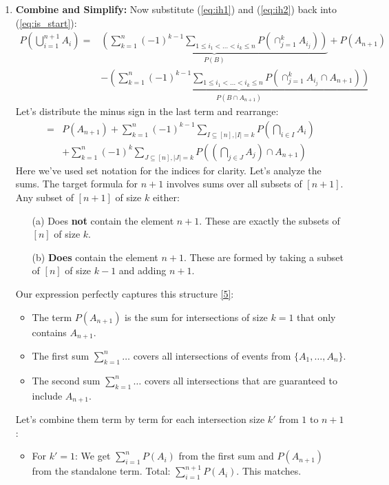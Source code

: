 \documentclass[11pt,a4paper]{article}
\begin{document}
\begin{enumerate}
    \item \textbf{Combine and Simplify:} Now substitute (\ref{eq:ih1}) and (\ref{eq:ih2}) back into (\ref{eq:is_start}):
    \begin{align*}
    P\left(\bigcup_{i=1}^{n+1} A_i\right) = & \underbrace{\left( \sum_{k=1}^n (-1)^{k-1} \sum_{1 \le i_1 < \dots < i_k \le n} P(\cap_{j=1}^k A_{i_j}) \right)}_{P(B)} + P(A_{n+1}) \\
    & - \underbrace{\left( \sum_{k=1}^n (-1)^{k-1} \sum_{1 \le i_1 < \dots < i_k \le n} P(\cap_{j=1}^k A_{i_j} \cap A_{n+1}) \right)}_{P(B \cap A_{n+1})}
    \end{align*}
    Let's distribute the minus sign in the last term and rearrange:
    \begin{align*}
    = & P(A_{n+1}) + \sum_{k=1}^n (-1)^{k-1} \sum_{I \subseteq [n], |I|=k} P(\bigcap_{i \in I} A_i) \\
    & + \sum_{k=1}^n (-1)^{k} \sum_{J \subseteq [n], |J|=k} P\left(\left(\bigcap_{j \in J} A_j\right) \cap A_{n+1}\right)
    \end{align*}
    Here we've used set notation for the indices for clarity. Let's analyze the sums. The target formula for $n+1$ involves sums over all subsets of $[n+1]$. Any subset of $[n+1]$ of size $k$ either:
    \begin{itemize}
        \item[(a)] Does \textbf{not} contain the element $n+1$. These are exactly the subsets of $[n]$ of size $k$.
        \item[(b)] \textbf{Does} contain the element $n+1$. These are formed by taking a subset of $[n]$ of size $k-1$ and adding $n+1$.
    \end{itemize}
    Our expression perfectly captures this structure \hyperlink{note:pascal}{[5]}:
    \begin{itemize}
        \item The term $P(A_{n+1})$ is the sum for intersections of size $k=1$ that only contains $A_{n+1}$.
        \item The first sum $\sum_{k=1}^n \dots$ covers all intersections of events from $\{A_1, \dots, A_n\}$.
        \item The second sum $\sum_{k=1}^n \dots$ covers all intersections that are guaranteed to include $A_{n+1}$.
    \end{itemize}
    Let's combine them term by term for each intersection size $k'$ from $1$ to $n+1$:
    \begin{itemize}
        \item For $k'=1$: We get $\sum_{i=1}^n P(A_i)$ from the first sum and $P(A_{n+1})$ from the standalone term. Total: $\sum_{i=1}^{n+1} P(A_i)$. This matches.

\end{itemize}
\end{enumerate}
\end{document}
